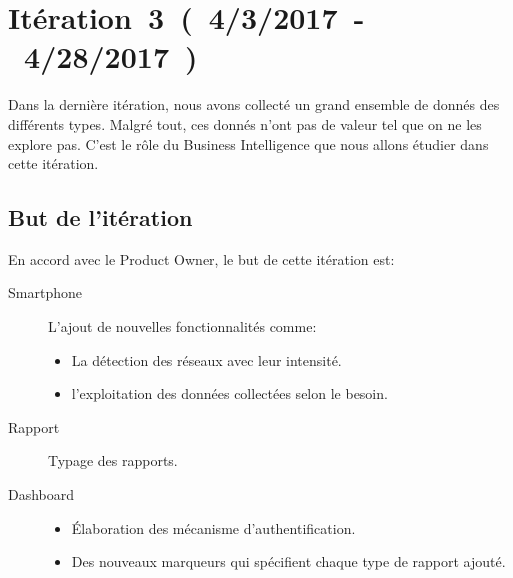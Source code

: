 \chapter{Itération~3~(~4/3/2017~-~4/28/2017~)}


Dans la dernière itération, nous avons collecté un grand ensemble de donnés des
différents types. Malgré tout, ces donnés n'ont pas de valeur tel que on ne les
explore pas. C'est le rôle du Business Intelligence que nous allons étudier
dans cette itération.

\section{But de l'itération}

En accord avec le Product Owner, le but de cette itération est:

\begin{description}
    \item [Smartphone] L'ajout de nouvelles fonctionnalités comme:
        \begin{itemize}
            \item La détection des réseaux avec leur intensité.
            \item l'exploitation des données collectées selon le besoin.
        \end{itemize}
    \item [Rapport] Typage des rapports.
    \item [Dashboard] \textbf{}

        \begin{itemize}
            \item Élaboration des mécanisme d'authentification.
            \item Des nouveaux marqueurs qui spécifient chaque type de rapport
                ajouté.
        \end{itemize}
\end{description}



